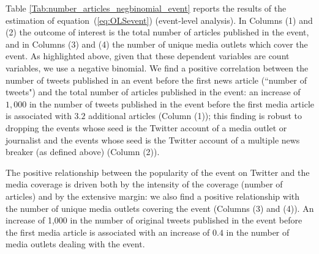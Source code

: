 Table \ref{Tab:number_articles_negbinomial_event} reports the results of the estimation of equation~(\ref{eq:OLSevent}) (event-level analysis). In Columns (1) and (2) the outcome of interest is the total number of articles published in the event, and in Columns (3) and (4) the number of unique media outlets which cover the event. As highlighted above, given that these dependent variables are count variables, we use a negative binomial. We find a positive correlation between the number of tweets published in an event before the first news article (``number of tweets") and the total number of articles published in the event: an increase of $1,000$ in the number of tweets published in the event before the first media article is associated with $3.2$ additional articles (Column (1)); this finding is robust to dropping the events whose seed is the Twitter account of a media outlet or journalist and the events whose seed is the Twitter account of a multiple news breaker (as defined above)  (Column (2)).

The positive relationship between the popularity of the event on Twitter and the media coverage is driven both by the intensity of the coverage (number of articles) and by the extensive margin: we also find a positive relationship with the number of unique media outlets covering the event (Columns (3) and (4)). An increase of 1,000 in the number of original tweets published in the event before the first media article is associated with an increase of $0.4$ in the number of media outlets dealing with the event.


